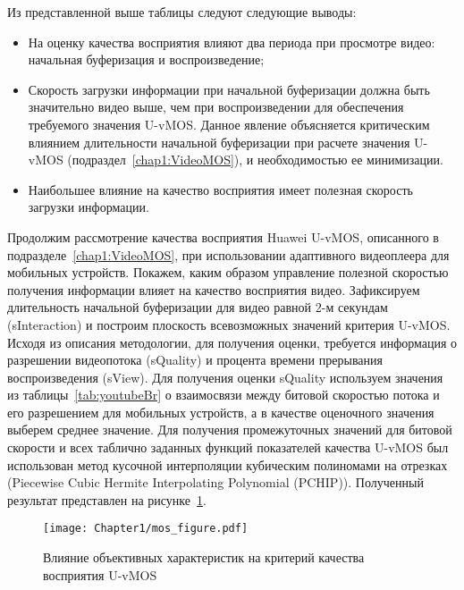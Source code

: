 Из представленной выше таблицы следуют следующие выводы:
\begin{itemize}
	\item На оценку качества восприятия влияют два периода при просмотре видео: начальная буферизация и воспроизведение;
	\item Скорость загрузки информации при начальной буферизации должна быть значительно видео выше, чем при воспроизведении для обеспечения требуемого значения U-vMOS. Данное явление объясняется критическим влиянием длительности начальной буферизации при расчете значения U-vMOS (подраздел~\ref{chap1:VideoMOS}), и необходимостью ее минимизации.
	\item Наибольшее влияние на качество восприятия имеет полезная скорость загрузки информации.
\end{itemize}

Продолжим рассмотрение качества восприятия Huawei U-vMOS, описанного в подразделе~\ref{chap1:VideoMOS}, при использовании адаптивного видеоплеера для мобильных устройств. Покажем, каким образом управление полезной скоростью получения информации влияет на качество восприятия видео. Зафиксируем длительность начальной буферизации для видео равной 2-м секундам (sInteraction) и построим плоскость всевозможных значений критерия U-vMOS. Исходя из описания методологии, для получения оценки, требуется информация о разрешении видеопотока (sQuality) и процента времени прерывания воспроизведения (sView). Для получения оценки sQuality используем значения из таблицы~\ref{tab:youtubeBr} о взаимосвязи между битовой скоростью потока и его разрешением для мобильных устройств, а в качестве оценочного значения выберем среднее значение. Для получения промежуточных значений для битовой скорости и всех таблично заданных функций показателей качества U-vMOS был использован метод кусочной интерполяции кубическим полиномами на отрезках (Piecewise Cubic Hermite Interpolating Polynomial (PCHIP)). Полученный результат представлен на рисунке~\ref{fig:UvMOSDepending}.

\begin{figure}[htbp]
\begin{center}
\texttt{[image: Chapter1/mos\_figure.pdf]}
\caption{Влияние объективных характеристик на критерий качества восприятия U-vMOS}
\label{fig:UvMOSDepending}
\end{center}
\end{figure}

